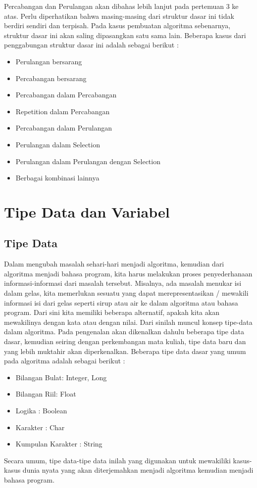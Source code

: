 Percabangan dan Perulangan akan dibahas lebih lanjut pada pertemuan 3 ke atas. Perlu diperhatikan bahwa masing-masing dari struktur dasar ini tidak berdiri sendiri dan terpisah. Pada kasus pembuatan algoritma sebenarnya, struktur dasar ini akan saling dipasangkan satu sama lain. Beberapa kasus dari penggabungan struktur dasar ini adalah sebagai berikut : 
\begin{itemize}
	\item Perulangan bersarang
	\item	Percabangan bersarang
	\item	Percabangan dalam Percabangan 
	\item	Repetition dalam Percabangan 
	\item	Percabangan dalam Perulangan 
	\item	Perulangan dalam Selection
	\item	Perulangan dalam Perulangan dengan Selection
	\item	Berbagai kombinasi lainnya
\end{itemize}


\section{Tipe Data dan Variabel}

\subsection{Tipe Data}
	Dalam mengubah masalah sehari-hari menjadi algoritma, kemudian dari algoritma menjadi bahasa program, kita harus melakukan proses penyederhanaan informasi-informasi dari masalah tersebut. Misalnya, ada masalah menukar isi dalam gelas, kita memerlukan sesuatu yang dapat merepresentasikan / mewakili informasi isi dari gelas seperti sirup atau air  ke dalam algoritma atau bahasa program. Dari sini kita memiliki beberapa alternatif, apakah kita akan mewakilinya dengan kata atau dengan nilai. Dari sinilah muncul konsep tipe-data dalam algoritma. Pada pengenalan akan dikenalkan dahulu beberapa tipe data dasar, kemudian seiring dengan perkembangan mata kuliah, tipe data baru dan yang lebih muktahir akan diperkenalkan. 
Beberapa tipe data dasar yang umum pada algoritma adalah sebagai berikut : 
\begin{itemize}
	\item Bilangan Bulat: Integer, Long
	\item	Bilangan Riil: Float
	\item	Logika : Boolean
	\item	Karakter  : Char
	\item	Kumpulan Karakter : String 
\end{itemize}
Secara umum, tipe data-tipe data inilah yang digunakan untuk mewakiliki kasus-kasus dunia nyata yang akan diterjemahkan menjadi algoritma kemudian menjadi bahasa program. 	


